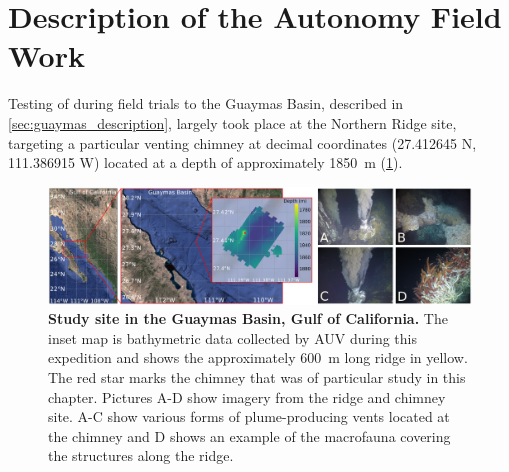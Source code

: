 \section{Description of the Autonomy Field Work}
Testing of \PHORTEX during field trials to the Guaymas Basin, described in \cref{sec:guaymas_description}, largely took place at the Northern Ridge site, targeting a particular venting chimney at decimal coordinates (27.412645 N, 111.386915 W) located at a depth of approximately \SI{1850}{\meter} (\cref{fig:autonomy_site}). 

\begin{figure}[h!]
    \centering
    \includegraphics[width=\columnwidth]{figures/site_summary.png}
    \caption[Study site in the Guaymas Basin, Gulf of California]{\textbf{Study site in the Guaymas Basin, Gulf of California.} The inset map is bathymetric data collected by AUV \Sentry during this expedition and shows the approximately \SI{600}{\meter} long ridge in yellow. The red star marks the chimney that was of particular study in this chapter. Pictures A-D show imagery from the ridge and chimney site. A-C show various forms of plume-producing vents located at the chimney and D shows an example of the macrofauna covering the structures along the ridge.}
    \label{fig:autonomy_site}
\end{figure}

